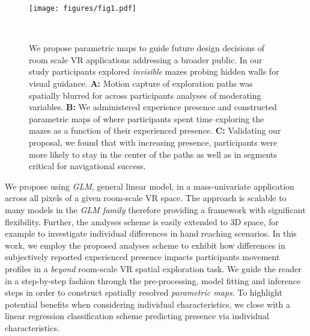\begin{figure*}[!ht]
\centering
  \texttt{[image: figures/fig1.pdf]}
  \caption{We propose parametric maps to guide future design decisions of room scale VR applications addressing a broader public. In our study participants explored \textit{invisible} mazes probing hidden walls for visual guidance. \textbf{A:} Motion capture of exploration paths was spatially blurred for across participants analyses of moderating variables. \textbf{B:} We administered experience presence and constructed parametric maps of where participants spent time exploring the mazes as a function of their experienced presence. \textbf{C:} Validating our proposal, we found that with increasing presence, participants were more likely to stay in the center of the paths as well as in segments critical for navigational success.}~\label{fig:methods}
\end{figure*}

We propose using \textit{GLM}, general linear model, in a mass-univariate application across all pixels of a given room-scale VR space. The approach is scalable to many models in the \textit{GLM family} therefore providing a framework with significant flexibility. Further, the analyses scheme is easily extended to 3D space, for example to investigate individual differences in hand reaching scenarios. In this work, we employ the proposed analyses scheme to exhibit how differences in subjectively reported experienced presence impacts participants movement profiles in a \textit{beyond} room-scale VR spatial exploration task. We guide the reader in a step-by-step fashion through the pre-processing, model fitting and inference steps in order to construct spatially resolved \textit{parametric maps}. To highlight potential benefits when considering individual characteristics, we close with a linear regression classification scheme predicting presence via individual characteristics.

